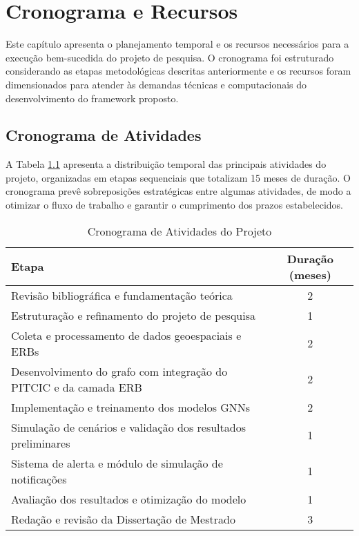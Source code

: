 \chapter{Cronograma e Recursos}
\label{chap:cronograma}

Este capítulo apresenta o planejamento temporal e os recursos necessários para a execução bem-sucedida do projeto de pesquisa. O cronograma foi estruturado considerando as etapas metodológicas descritas anteriormente e os recursos foram dimensionados para atender às demandas técnicas e computacionais do desenvolvimento do framework proposto.

\section{Cronograma de Atividades}

A Tabela \ref{tab:cronograma-atividades} apresenta a distribuição temporal das principais atividades do projeto, organizadas em etapas sequenciais que totalizam 15 meses de duração. O cronograma prevê sobreposições estratégicas entre algumas atividades, de modo a otimizar o fluxo de trabalho e garantir o cumprimento dos prazos estabelecidos.

\begin{table}[H]
    \centering
    \caption{Cronograma de Atividades do Projeto}
    \label{tab:cronograma-atividades}
    \begin{tabular}{lc}
        \toprule
        \textbf{Etapa} & \textbf{Duração (meses)} \\
        \midrule
        Revisão bibliográfica e fundamentação teórica & 2 \\
        Estruturação e refinamento do projeto de pesquisa & 1 \\
        Coleta e processamento de dados geoespaciais e \gls{ERB}s & 2 \\
        Desenvolvimento do grafo com integração do \gls{PITCIC} e da camada \gls{ERB} & 2 \\
        Implementação e treinamento dos modelos \gls{GNN}s & 2 \\
        Simulação de cenários e validação dos resultados preliminares & 1 \\
        Sistema de alerta e módulo de simulação de notificações & 1 \\
        Avaliação dos resultados e otimização do modelo & 1 \\
        Redação e revisão da Dissertação de Mestrado & 3 \\
        \bottomrule
    \end{tabular}
\end{table}

